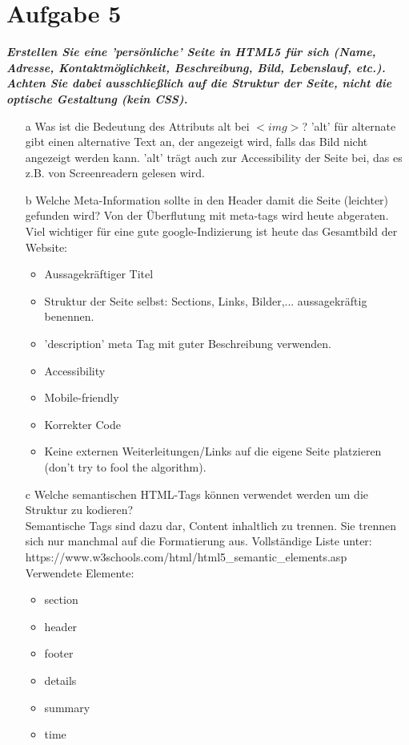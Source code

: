 \documentclass[12pt, a4paper]{report}
\begin{document}
\section*{Aufgabe 5}
\textbf{\textit{Erstellen Sie eine ’persönliche’ Seite in HTML5 für sich (Name, Adresse, Kontaktmöglichkeit, Beschreibung, Bild, Lebenslauf, etc.). Achten Sie dabei ausschließlich auf die Struktur der Seite, nicht die optische Gestaltung (kein CSS).}}

\begin{itemize}
  \item[a] Was ist die Bedeutung des Attributs alt bei $<img>$?
  'alt' für alternate gibt einen alternative Text an, der angezeigt wird, falls das Bild nicht
  angezeigt werden kann. 'alt' trägt auch zur Accessibility der Seite bei, das es z.B. von Screenreadern
  gelesen wird.
  \item[b] Welche Meta-Information sollte in den Header damit die Seite (leichter) gefunden wird?
  Von der Überflutung mit meta-tags wird heute abgeraten. Viel wichtiger für eine gute google-Indizierung ist
  heute das Gesamtbild der Website:
  \begin{itemize}
  	\item Aussagekräftiger Titel
  	\item Struktur der Seite selbst: Sections, Links, Bilder,... aussagekräftig benennen.
  	\item 'description' meta Tag mit guter Beschreibung verwenden.
  	\item Accessibility
  	\item Mobile-friendly
  	\item Korrekter Code
  	\item Keine externen Weiterleitungen/Links auf die eigene Seite platzieren (don't try to fool the algorithm).
  \end{itemize}
  \item[c] Welche semantischen HTML-Tags können verwendet werden um die Struktur zu kodieren?\\
  Semantische Tags sind dazu dar, Content inhaltlich zu trennen. Sie trennen sich nur manchmal auf die 
  Formatierung aus.
  Vollständige Liste unter:\\
  https://www.w3schools.com/html/html5\_semantic\_elements.asp\\
  Verwendete Elemente:\\
  \begin{itemize}
  	\item section
  	\item header
  	\item footer
  	\item details
  	\item summary
  	\item time
  \end{itemize}  
\end{itemize}
\end{document}
